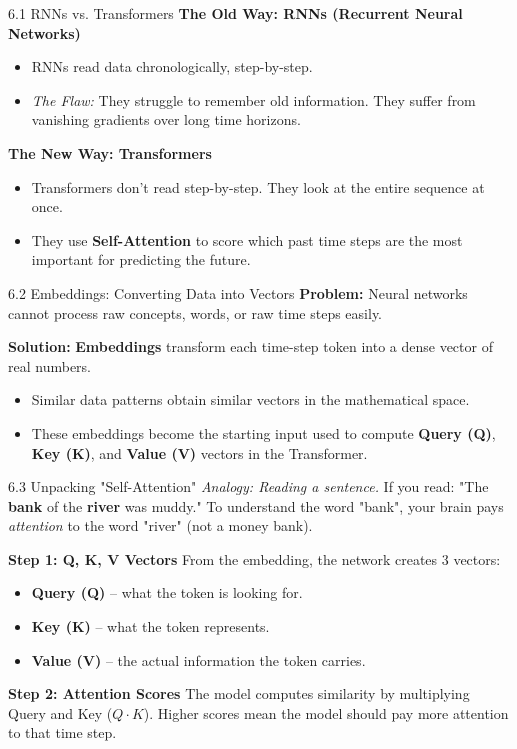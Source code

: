 \documentclass[aspectratio=169]{beamer}
\begin{document}
\begin{frame}{6.1 RNNs vs. Transformers}
    \textbf{The Old Way: RNNs (Recurrent Neural Networks)}
    \begin{itemize}
        \item RNNs read data chronologically, step-by-step.
        \item \textit{The Flaw:} They struggle to remember old information. They suffer from vanishing gradients over long time horizons.
    \end{itemize}

    \vspace{0.3cm}
    \textbf{The New Way: Transformers}
    \begin{itemize}
        \item Transformers don't read step-by-step. They look at the entire sequence at once.
        \item They use \textbf{Self-Attention} to score which past time steps are the most important for predicting the future.
    \end{itemize}
\end{frame}

\begin{frame}{6.2 Embeddings: Converting Data into Vectors}
    \textbf{Problem:} Neural networks cannot process raw concepts, words, or raw time steps easily.
    
    \textbf{Solution:} \textbf{Embeddings} transform each time-step token into a dense vector of real numbers.
    \begin{itemize}
        \item Similar data patterns obtain similar vectors in the mathematical space.
        \item These embeddings become the starting input used to compute \textbf{Query (Q)}, \textbf{Key (K)}, and \textbf{Value (V)} vectors in the Transformer.
    \end{itemize}
\end{frame}

\begin{frame}{6.3 Unpacking "Self-Attention"}
    \textit{Analogy: Reading a sentence.}
    If you read: "The \textbf{bank} of the \textbf{river} was muddy."
    To understand the word "bank", your brain pays \textit{attention} to the word "river" (not a money bank). 
    
    \vspace{0.2cm}
    \textbf{Step 1: Q, K, V Vectors}
    From the embedding, the network creates 3 vectors:
    \begin{itemize}
        \item \textbf{Query (Q)} – what the token is looking for.
        \item \textbf{Key (K)} – what the token represents.
        \item \textbf{Value (V)} – the actual information the token carries.
    \end{itemize}

    \textbf{Step 2: Attention Scores}
    The model computes similarity by multiplying Query and Key ($Q \cdot K$). Higher scores mean the model should pay more attention to that time step.
\end{frame}
\end{document}
